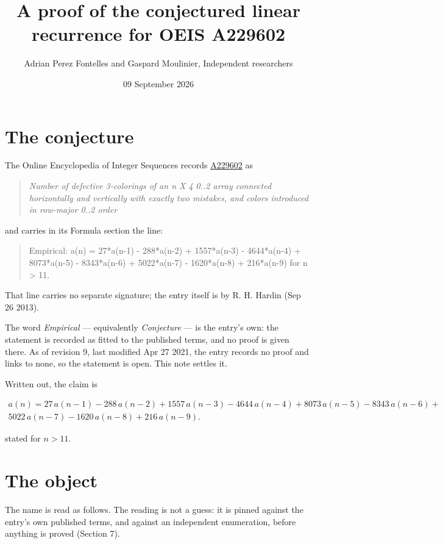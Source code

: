 \documentclass[11pt]{article}
\title{A proof of the conjectured linear recurrence for OEIS A229602}
\author{Adrian Perez Fontelles and Gaspard Moulinier, Independent researchers}
\date{09 September 2026}
\theoremstyle{definition}
\begin{document}
\maketitle
\section{The conjecture}

The Online Encyclopedia of Integer Sequences records \href{https://oeis.org/A229602}{A229602} as

\begin{quote}\itshape Number of defective 3-colorings of an n X 4 0..2 array connected horizontally and vertically with exactly two mistakes, and colors introduced in row-major 0..2 order\end{quote}

and carries in its Formula section the line:

\begin{quote}\ttfamily Empirical: a(n) = 27*a(n-1) - 288*a(n-2) + 1557*a(n-3) - 4644*a(n-4) + 8073*a(n-5) - 8343*a(n-6) + 5022*a(n-7) - 1620*a(n-8) + 216*a(n-9) for n > 11.\end{quote}

That line carries no separate signature; the entry itself is by R. H. Hardin (Sep 26 2013).

The word {\itshape Empirical} --- equivalently {\itshape Conjecture} --- is the entry's own: the statement is recorded as fitted to the published terms, and no proof is given there. As of revision 9, last modified Apr 27 2021, the entry records no proof and links to none, so the statement is open. This note settles it.

Written out, the claim is

\begin{multline*} a(n) = 27\,a(n-1) - 288\,a(n-2) + 1557\,a(n-3) - 4644\,a(n-4) + 8073\,a(n-5) - 8343\,a(n-6) + \\ 5022\,a(n-7) - 1620\,a(n-8) + 216\,a(n-9). \end{multline*}

stated for $n > 11$.

\section{The object}

The name is read as follows. The reading is not a guess: it is pinned against the entry's own published terms, and against an independent enumeration, before anything is proved (Section 7).
\end{document}
